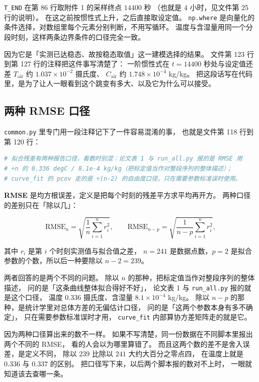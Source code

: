 \texttt{T\_END} 在第 86 行取附件 1 的采样终点 $14400$ 秒
（也就是 $4$ 小时，见文件第 25 行的说明）。
在这之前按惯性式上升，之后直接取设定值。
\texttt{np.where} 是向量化的条件选择，对数组里每个元素分别判断，不用写循环。
温度与含湿量用同一个分段时刻，这样两条边界条件的口径完全一致。

因为它是「实测已达稳态、故按稳态取值」这一建模选择的结果。
文件第 123 行到第 127 行的注释把这件事写清楚了：
一阶惯性式在 $t=14400$ 秒处与设定值还差
$T_{\mathrm{air}}$ 约 $1.037\times10^{-2}$ 摄氏度、
$C_{\mathrm{air}}$ 约 $1.748\times10^{-4}$ kg/kg。
把这段话写在代码里，是为了让人一眼看到这个跳变有多大、以及它为什么可以接受。

\subsection{两种 RMSE 口径}

\texttt{common.py} 里专门用一段注释记下了一件容易混淆的事，
也就是文件第 118 行到第 120 行：

\begin{lstlisting}[language=Python]
# 拟合残差有两种报告口径，看数时别混：论文表 1 与 run_all.py 报的是 RMSE 用
# ÷n 的 0.336 degC / 8.1e-4 kg/kg（把标定值当作对整段序列的整体描述）；
# curve_fit 的 pcov 走的是 ÷(n-2) 的自由度口径，只在需要参数标准误时使用。
\end{lstlisting}

\textbf{RMSE} 是均方根误差，定义是把每个时刻的残差平方求平均再开方。
两种口径的差别只在「除以几」：

\begin{equation}
\mathrm{RMSE}_{n}=\sqrt{\frac{1}{n}\sum_{i=1}^{n}r_i^2},
\qquad
\mathrm{RMSE}_{n-p}=\sqrt{\frac{1}{n-p}\sum_{i=1}^{n}r_i^2},
\label{eq:p3-rmse}
\end{equation}

其中 $r_i$ 是第 $i$ 个时刻实测值与拟合值之差，
$n=241$ 是数据点数，$p=2$ 是拟合参数的个数，所以后一种要除以 $n-2=239$。

两者回答的是两个不同的问题。
除以 $n$ 的那种，把标定值当作对整段序列的整体描述，
问的是「这条曲线整体拟合得好不好」，
论文表 1 与 \texttt{run\_all.py} 报的就是这个口径，
温度 $0.336$ 摄氏度、含湿量 $8.1\times10^{-4}$ kg/kg。
除以 $n-p$ 的那种，是统计学里对总体方差的无偏估计口径，
问的是「这两个参数本身有多不确定」，
只在需要参数标准误时才用，
\texttt{curve\_fit} 内部算协方差矩阵走的就是它。

因为两种口径算出来的数不一样。
如果不写清楚，同一份数据在不同脚本里报出两个不同的 RMSE，
看的人会以为哪里算错了。
而且这两个数的差不是舍入误差，是定义不同，
除以 $239$ 比除以 $241$ 大约大百分之零点四，
在温度上就是 $0.336$ 与 $0.337$ 的区别。
把口径写下来，以后两个脚本报的数对不上时，
一眼就知道该去查哪一条。

